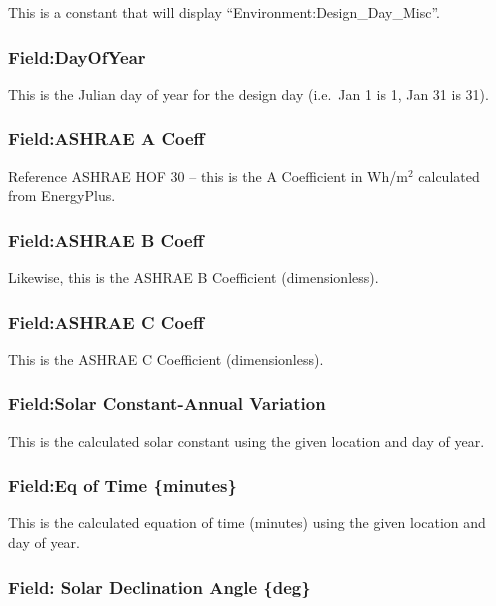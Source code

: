 This is a constant that will display ``Environment:Design\_Day\_Misc''.

\subsubsection{Field:DayOfYear}\label{fielddayofyear}

This is the Julian day of year for the design day (i.e.~Jan 1 is 1, Jan 31 is 31).

\subsubsection{Field:ASHRAE A Coeff}\label{fieldashrae-a-coeff}

Reference ASHRAE HOF 30 -- this is the A Coefficient in Wh/m\(^{2}\) calculated from EnergyPlus.

\subsubsection{Field:ASHRAE B Coeff}\label{fieldashrae-b-coeff}

Likewise, this is the ASHRAE B Coefficient (dimensionless).

\subsubsection{Field:ASHRAE C Coeff}\label{fieldashrae-c-coeff}

This is the ASHRAE C Coefficient (dimensionless).

\subsubsection{Field:Solar Constant-Annual Variation}\label{fieldsolar-constant-annual-variation}

This is the calculated solar constant using the given location and day of year.

\subsubsection{Field:Eq of Time \{minutes\}}\label{fieldeq-of-time-minutes}

This is the calculated equation of time (minutes) using the given location and day of year.

\subsubsection{Field: Solar Declination Angle \{deg\}}\label{field-solar-declination-angle-deg}


